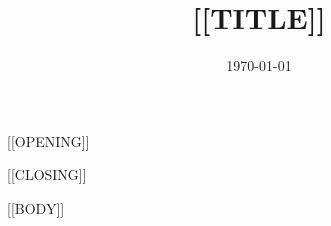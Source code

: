 \documentclass[11pt,a4paper,sans]{moderncv}
\title{[[TITLE]]}
\begin{document}
\date{\today}

\opening{[[OPENING]]}
\closing{[[CLOSING]]}

\makelettertitle

[[BODY]]

\makeletterclosing
\end{document}
